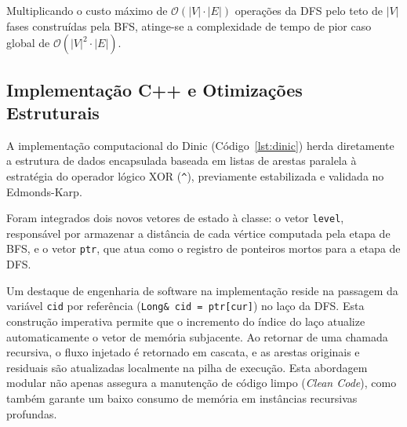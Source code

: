 \documentclass[12pt,a4paper]{article}
\begin{document}
Multiplicando o custo máximo de $\mathcal{O}(|V| \cdot |E|)$ operações da DFS pelo teto de $|V|$ fases construídas pela BFS, atinge-se a complexidade de tempo de pior caso global de $\mathcal{O}(|V|^2 \cdot |E|)$.

\subsection{Implementação C++ e Otimizações Estruturais}
A implementação computacional do Dinic (Código~\ref{lst:dinic}) herda diretamente a estrutura de dados encapsulada baseada em listas de arestas paralela à estratégia do operador lógico XOR (\lstinline{^}), previamente estabilizada e validada no Edmonds-Karp. 

Foram integrados dois novos vetores de estado à classe: o vetor \lstinline|level|, responsável por armazenar a distância de cada vértice computada pela etapa de BFS, e o vetor \lstinline|ptr|, que atua como o registro de ponteiros mortos para a etapa de DFS. 

Um destaque de engenharia de software na implementação reside na passagem da variável \lstinline|cid| por referência (\lstinline|Long& cid = ptr[cur]|) no laço da DFS. Esta construção imperativa permite que o incremento do índice do laço atualize automaticamente o vetor de memória subjacente. Ao retornar de uma chamada recursiva, o fluxo injetado é retornado em cascata, e as arestas originais e residuais são atualizadas localmente na pilha de execução. Esta abordagem modular não apenas assegura a manutenção de código limpo (\textit{Clean Code}), como também garante um baixo consumo de memória em instâncias recursivas profundas.
\end{document}
